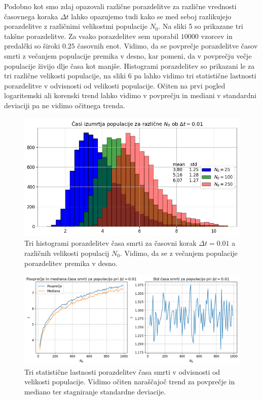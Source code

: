 \documentclass[slovene,11pt,a4paper]{article}
\begin{document}
Podobno kot smo zdaj opazovali različne porazdelitve za različne vrednosti časovnega koraka $\Delta t$ lahko opazujemo tudi kako se med seboj razlikujejo porazdelitve z različnimi velikostmi populacije $N_0$. Na sliki 5 so prikazane tri takšne porazdelitve. Za vsako porazdelitev sem uporabil $10000$ vzorcev in predalčki so široki $0.25$ časovnih enot. Vidimo, da se povprečje porazdelitve časov smrti z večanjem populacije premika v desno, kar pomeni, da v povprečju večje populacije živijo dlje časa kot manjše. Histogrami porazdelitev so prikazani le za tri različne velikosti populacije, na sliki 6 pa lahko vidimo tri statistične lastnosti porazdelitve v odvisnosti od velikosti populacije. Očiten na prvi pogled logaritemski ali korenski trend lahko vidimo v povprečju in mediani v standardni deviaciji pa ne vidimo očitnega trenda.

\newpage

\begin{figure}[h!]
\centering
\includegraphics[width=12cm]{slika5.png}
\caption{Tri histogrami porazdelitev časa smrti za časovni korak $\Delta t = 0.01$ a različnih velikosti populacij $N_0$. Vidimo, da se z večanjem populacije porazdelitev premika v desno.}
\end{figure}

\begin{figure}[h!]
\centering
\includegraphics[width=15cm]{slika6.png}
\caption{Tri statistične lastnosti porazdelitev časa smrti v odvisnosti od velikosti populacije. Vidimo očiten naraščajoč trend za povprečje in mediano ter stagniranje standardne deviacije.}
\end{figure}
\end{document}
